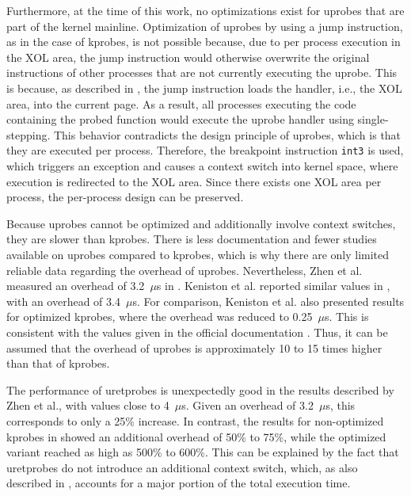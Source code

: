 Furthermore, at the time of this work, no optimizations exist for \acp{uprobe} that are part of the kernel mainline.  
Optimization of \acp{uprobe} by using a jump instruction, as in the case of \acp{kprobe}, is not possible because, due to per process execution in the XOL area, the jump instruction would otherwise overwrite the original instructions of other processes that are not currently executing the \ac{uprobe}.  
This is because, as described in \cite[p. 3-333]{jmp}, the jump instruction loads the handler, i.e., the XOL area, into the current page.  
As a result, all processes executing the code containing the probed function would execute the \ac{uprobe} handler using single-stepping.  
This behavior contradicts the design principle of \acp{uprobe}, which is that they are executed per process.
Therefore, the breakpoint instruction \texttt{int3} is used, which triggers an exception and causes a context switch into kernel space, where execution is redirected to the XOL area.  
Since there exists one XOL area per process, the per-process design can be preserved.  

Because \acp{uprobe} cannot be optimized and additionally involve context switches, they are slower than \acp{kprobe}.  
There is less documentation and fewer studies available on \acp{uprobe} compared to \acp{kprobe}, which is why there are only limited reliable data regarding the overhead of \acp{uprobe}.  
Nevertheless, Zhen et al. measured an overhead of 3.2~$\mu$s in \cite[p. 7]{zheng2023bpftimeuserspaceebpfruntime}.  
Keniston et al. reported similar values in \cite[p. 218]{keniston}, with an overhead of 3.4~$\mu$s.  
For comparison, Keniston et al. also presented results for optimized \acp{kprobe}, where the overhead was reduced to 0.25~$\mu$s.  
This is consistent with the values given in the official documentation \cite{kprobe_doc}.  
Thus, it can be assumed that the overhead of \acp{uprobe} is approximately 10 to 15 times higher than that of \acp{kprobe}.  

The performance of \acp{uretprobe} is unexpectedly good in the results described by Zhen et al., with values close to 4~$\mu$s.  
Given an overhead of 3.2~$\mu$s, this corresponds to only a 25\% increase.  
In contrast, the results for non-optimized \acp{kprobe} in \cite{kprobe_doc} showed an additional overhead of 50\% to 75\%, while the optimized variant reached as high as 500\% to 600\%.  
This can be explained by the fact that \acp{uretprobe} do not introduce an additional context switch, which, as also described in \cite{zheng2023bpftimeuserspaceebpfruntime}, accounts for a major portion of the total execution time.  

